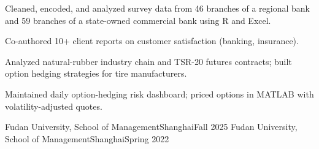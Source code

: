 \documentclass[11pt, letterpaper]{awesome-cv}
\begin{document}
\begin{cventries}
    {
      \begin{cvitems}
        \item {Cleaned, encoded, and analyzed survey data from 46 branches of a regional bank and 59 branches of a state-owned commercial bank using R and Excel.}
        \item {Co-authored 10+ client reports on customer satisfaction (banking, insurance).}
      \end{cvitems}
    }

    {
      \begin{cvitems}
        \item {Analyzed natural-rubber industry chain and TSR-20 futures contracts; built option hedging strategies for tire manufacturers.}
        \item {Maintained daily option-hedging risk dashboard; priced options in MATLAB with volatility-adjusted quotes.}
      \end{cvitems}
    }
\end{cventries}

\begin{cvhonors}
\end{cvhonors}

\begin{cventries}
    {Fudan University, School of Management}{Shanghai}{Fall 2025}{}
    {Fudan University, School of Management}{Shanghai}{Spring 2022}{}
\end{cventries}

\begin{cvhonors}
\end{cvhonors}
\end{document}
